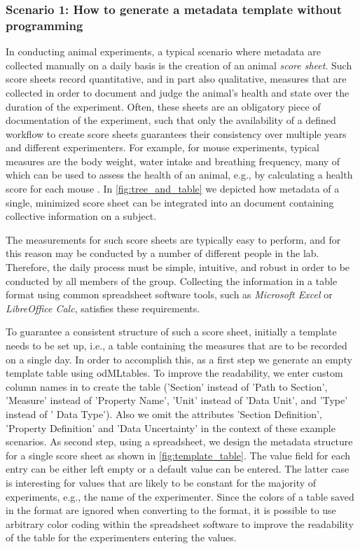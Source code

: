 \subsubsection*{Scenario 1: How to generate a metadata template without programming}
\label{sec:Template-Generation}
In conducting animal experiments, a typical scenario where metadata are collected manually on a daily basis is the creation of an animal \textit{score sheet}. Such score sheets record quantitative, and in part also qualitative, measures that are collected in order to document and judge the animal's health and state over the duration of the experiment. Often, these sheets are an obligatory piece of documentation of the experiment, such that only the availability of a defined workflow to create score sheets guarantees their consistency over multiple years and different experimenters. For example, for mouse experiments, typical measures are the body weight, water intake and breathing frequency, many of which can be used to assess the health of an animal, e.g., by calculating a health score for each mouse \citep{Foltz_1999, Burkholder_2012}. In \cref{fig:tree_and_table} we depicted how metadata of a single, minimized score sheet can be integrated into an  document containing collective information on a subject.

The measurements for such score sheets are typically easy to perform, and for this reason may be conducted by a number of different people in the lab. Therefore, the daily process must be simple, intuitive, and robust in order to be conducted by all members of the group. Collecting the information in a table format using common spreadsheet software tools, such as \textit{Microsoft Excel} or \textit{LibreOffice Calc}, satisfies these requirements. 

To guarantee a consistent structure of such a score sheet, initially a template needs to be set up, i.e., a table containing the measures that are to be recorded on a single day. In order to accomplish this, as a first step we generate an empty template table using odMLtables. To improve the readability, we enter custom column names in  to create the table ('Section' instead of 'Path to Section', 'Measure' instead of 'Property Name', 'Unit' instead of 'Data Unit', and 'Type' instead of ' Data Type'). Also we omit the attributes 'Section Definition', 'Property Definition' and 'Data Uncertainty' in the context of these example scenarios. As second step, using a spreadsheet, we design the metadata structure for a single score sheet as shown in \cref{fig:template_table}. The value field for each entry can be either left empty or a default value can be entered. The latter case is interesting for values that are likely to be constant for the majority of experiments, e.g., the name of the experimenter. Since the colors of a table saved in the  format are ignored when converting to the  format, it is possible to use arbitrary color coding within the spreadsheet software to improve the readability of the table for the experimenters entering the values.

